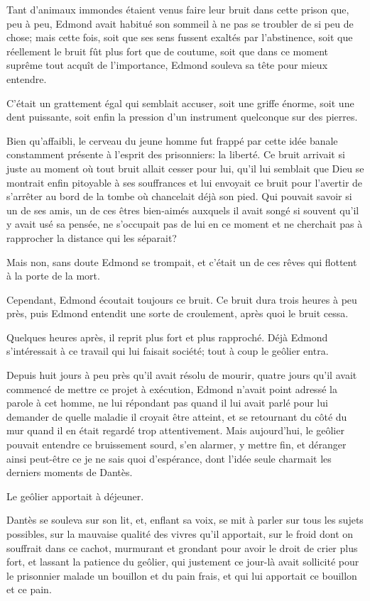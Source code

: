 Tant d'animaux immondes étaient venus faire leur bruit dans cette prison que, peu à peu, Edmond avait habitué son sommeil à ne pas se troubler de si peu de chose; mais cette fois, soit que ses sens fussent exaltés par l'abstinence, soit que réellement le bruit fût plus fort que de coutume, soit que dans ce moment suprême tout acquît de l'importance, Edmond souleva sa tête pour mieux entendre.

C'était un grattement égal qui semblait accuser, soit une griffe énorme, soit une dent puissante, soit enfin la pression d'un instrument quelconque sur des pierres.

Bien qu'affaibli, le cerveau du jeune homme fut frappé par cette idée banale constamment présente à l'esprit des prisonniers: la liberté. Ce bruit arrivait si juste au moment où tout bruit allait cesser pour lui, qu'il lui semblait que Dieu se montrait enfin pitoyable à ses souffrances et lui envoyait ce bruit pour l'avertir de s'arrêter au bord de la tombe où chancelait déjà son pied. Qui pouvait savoir si un de ses amis, un de ces êtres bien-aimés auxquels il avait songé si souvent qu'il y avait usé sa pensée, ne s'occupait pas de lui en ce moment et ne cherchait pas à rapprocher la distance qui les séparait?

Mais non, sans doute Edmond se trompait, et c'était un de ces rêves qui flottent à la porte de la mort.

Cependant, Edmond écoutait toujours ce bruit. Ce bruit dura trois heures à peu près, puis Edmond entendit une sorte de croulement, après quoi le bruit cessa.

Quelques heures après, il reprit plus fort et plus rapproché. Déjà Edmond s'intéressait à ce travail qui lui faisait société; tout à coup le geôlier entra.

Depuis huit jours à peu près qu'il avait résolu de mourir, quatre jours qu'il avait commencé de mettre ce projet à exécution, Edmond n'avait point adressé la parole à cet homme, ne lui répondant pas quand il lui avait parlé pour lui demander de quelle maladie il croyait être atteint, et se retournant du côté du mur quand il en était regardé trop attentivement. Mais aujourd'hui, le geôlier pouvait entendre ce bruissement sourd, s'en alarmer, y mettre fin, et déranger ainsi peut-être ce je ne sais quoi d'espérance, dont l'idée seule charmait les derniers moments de Dantès.

Le geôlier apportait à déjeuner.

Dantès se souleva sur son lit, et, enflant sa voix, se mit à parler sur tous les sujets possibles, sur la mauvaise qualité des vivres qu'il apportait, sur le froid dont on souffrait dans ce cachot, murmurant et grondant pour avoir le droit de crier plus fort, et lassant la patience du geôlier, qui justement ce jour-là avait sollicité pour le prisonnier malade un bouillon et du pain frais, et qui lui apportait ce bouillon et ce pain.

